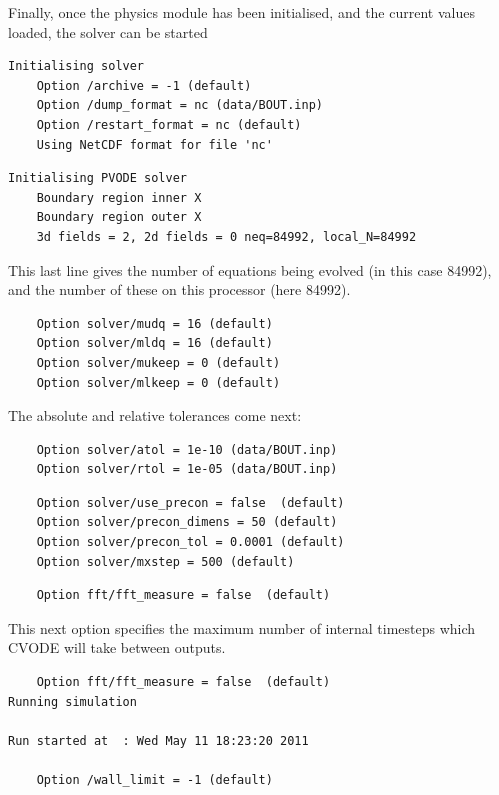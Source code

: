 \documentclass[12pt]{article}
\begin{document}
Finally, once the physics module has been initialised, and the current values
loaded, the solver can be started
%
\begin{verbatim}
Initialising solver
	Option /archive = -1 (default)
	Option /dump_format = nc (data/BOUT.inp)
	Option /restart_format = nc (default)
	Using NetCDF format for file 'nc'
\end{verbatim}
%
\begin{verbatim}
Initialising PVODE solver
	Boundary region inner X
	Boundary region outer X
	3d fields = 2, 2d fields = 0 neq=84992, local_N=84992
\end{verbatim}
%
This last line gives the number of equations being evolved (in this case
84992), and the number of these on this processor (here 84992).
%
\begin{verbatim}
	Option solver/mudq = 16 (default)
	Option solver/mldq = 16 (default)
	Option solver/mukeep = 0 (default)
	Option solver/mlkeep = 0 (default)
\end{verbatim}
%
The absolute and relative tolerances come next:
%
\begin{verbatim}
	Option solver/atol = 1e-10 (data/BOUT.inp)
	Option solver/rtol = 1e-05 (data/BOUT.inp)
\end{verbatim}
%
\begin{verbatim}
	Option solver/use_precon = false  (default)
	Option solver/precon_dimens = 50 (default)
	Option solver/precon_tol = 0.0001 (default)
	Option solver/mxstep = 500 (default)
\end{verbatim}
%
\begin{verbatim}
	Option fft/fft_measure = false  (default)
\end{verbatim}
%
This next option specifies the maximum number of internal timesteps which CVODE
will take between outputs.
%
\begin{verbatim}
	Option fft/fft_measure = false  (default)
Running simulation

Run started at  : Wed May 11 18:23:20 2011

	Option /wall_limit = -1 (default)
\end{verbatim}
%
\end{document}
